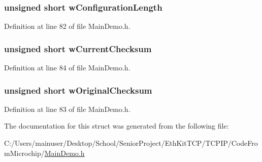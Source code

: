 \subsubsection[{w\+Configuration\+Length}]{\setlength{\rightskip}{0pt plus 5cm}unsigned short w\+Configuration\+Length}\label{struct_n_v_m___v_a_l_i_d_a_t_i_o_n___s_t_r_u_c_t_a8102ecc423e38978269aae097241977d}


Definition at line 82 of file Main\+Demo.\+h.

\hypertarget{struct_n_v_m___v_a_l_i_d_a_t_i_o_n___s_t_r_u_c_t_abfa2c898374183faeb7eb95ab91d8397}{}
\subsubsection[{w\+Current\+Checksum}]{\setlength{\rightskip}{0pt plus 5cm}unsigned short w\+Current\+Checksum}\label{struct_n_v_m___v_a_l_i_d_a_t_i_o_n___s_t_r_u_c_t_abfa2c898374183faeb7eb95ab91d8397}


Definition at line 84 of file Main\+Demo.\+h.

\hypertarget{struct_n_v_m___v_a_l_i_d_a_t_i_o_n___s_t_r_u_c_t_aa9ddd8c89f06a1317f4913c2b11cbfed}{}
\subsubsection[{w\+Original\+Checksum}]{\setlength{\rightskip}{0pt plus 5cm}unsigned short w\+Original\+Checksum}\label{struct_n_v_m___v_a_l_i_d_a_t_i_o_n___s_t_r_u_c_t_aa9ddd8c89f06a1317f4913c2b11cbfed}


Definition at line 83 of file Main\+Demo.\+h.



The documentation for this struct was generated from the following file\+:\begin{DoxyCompactItemize}
\item 
C\+:/\+Users/mainuser/\+Desktop/\+School/\+Senior\+Project/\+Eth\+Kit\+T\+C\+P/\+T\+C\+P\+I\+P/\+Code\+From\+Microchip/\hyperlink{_main_demo_8h}{Main\+Demo.\+h}\end{DoxyCompactItemize}
